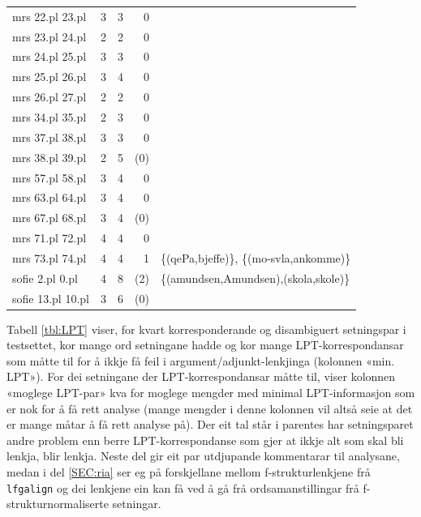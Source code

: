 \documentclass[12pt,a4paper,oneside,draft]{report}
\begin{document}
\begin{table}[htb]
\begin{center}
\begin{tabular}{lrrrl}
 mrs 22.pl 23.pl    &      3  &      3  &         0  &                                                \\
 mrs 23.pl 24.pl    &      2  &      2  &         0  &                                                \\
 mrs 24.pl 25.pl    &      3  &      3  &         0  &                                                \\
 mrs 25.pl 26.pl    &      3  &      4  &         0  &                                                \\
 mrs 26.pl 27.pl    &      2  &      2  &         0  &                                                \\
 mrs 34.pl 35.pl    &      2  &      3  &         0  &                                                \\
 mrs 37.pl 38.pl    &      3  &      3  &         0  &                                                \\
 mrs 38.pl 39.pl    &      2  &      5  &       (0)  &                                                \\
 mrs 57.pl 58.pl    &      3  &      4  &         0  &                                                \\
 mrs 63.pl 64.pl    &      3  &      4  &         0  &                                                \\
 mrs 67.pl 68.pl    &      3  &      4  &       (0)  &                                                \\
 mrs 71.pl 72.pl    &      4  &      4  &         0  &                                                \\
 mrs 73.pl 74.pl    &      4  &      4  &         1  &  \{(qePa,bjeffe)\}, \{(mo-svla,ankomme)\}      \\
 sofie 2.pl 0.pl    &      4  &      8  &       (2)  &  \{(amundsen,Amundsen),(skola,skole)\}         \\
 sofie 13.pl 10.pl  &      3  &      6  &       (0)  &                                                \\
\end{tabular}
\end{center}
\end{table}


Tabell \ref{tbl:LPT} viser, for kvart korresponderande og disambiguert
setningspar i testsettet, kor mange ord setningane hadde og kor mange
LPT-korrespondansar som måtte til for å ikkje få feil i
argument/adjunkt-lenkjinga (kolonnen «min. LPT»). For dei setningane
der LPT-korrespondansar måtte til, viser kolonnen «moglege LPT-par»
kva for moglege mengder med minimal LPT-informasjon som er nok for å
få rett analyse (mange mengder i denne kolonnen vil altså seie at det
er mange måtar å få rett analyse på).  Der eit tal står i parentes har
setningsparet andre problem enn berre LPT-korrespondanse som gjer at
ikkje alt som skal bli lenkja, blir lenkja. Neste del gir eit par
utdjupande kommentarar til analysane, medan i del \ref{SEC:ria} ser eg
på forskjellane mellom f-strukturlenkjene frå \texttt{lfgalign} og dei
lenkjene ein kan få ved å gå frå ordsamanstillingar frå
f-strukturnormaliserte setningar.
\end{document}
